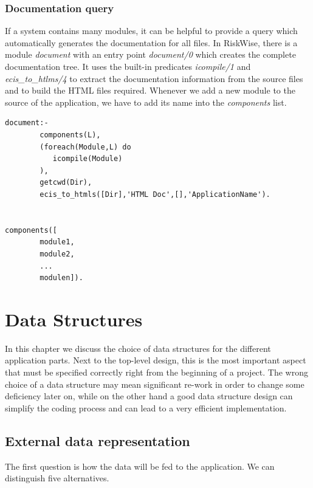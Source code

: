 \documentclass[a4paper,12pt]{report}
\begin{document}
\subsection{Documentation query}
If a system contains many modules, it can be helpful to provide a query which automatically generates the documentation for all files. In RiskWise, there is a module {\it document} with an entry point {\it document/0} which creates the complete documentation tree. It uses the built-in predicates {\it icompile/1} and {\it ecis\_to\_htlms/4} to extract the documentation information from the source files and to build the HTML files required. Whenever we add a new module to the source of the application, we have to add its name into the {\it components} list.
\begin{verbatim}
document:-
        components(L),
        (foreach(Module,L) do
           icompile(Module)
        ),
        getcwd(Dir),
        ecis_to_htmls([Dir],'HTML Doc',[],'ApplicationName').


components([
        module1,
        module2,
        ...
        modulen]).
\end{verbatim}
\chapter{Data Structures}
\label{datastructures}

In this chapter we discuss the choice of data structures for the different application parts. Next to the top-level design, this is the most important aspect that must be specified correctly right from the beginning of a project. The wrong choice of a data structure may mean significant re-work in order to change some deficiency later on, while on the other hand a good data structure design can simplify the coding process and can lead to a very efficient implementation.

\section{External data representation}
The first question is how the data will be fed to the application. We can distinguish five alternatives.
\end{document}
